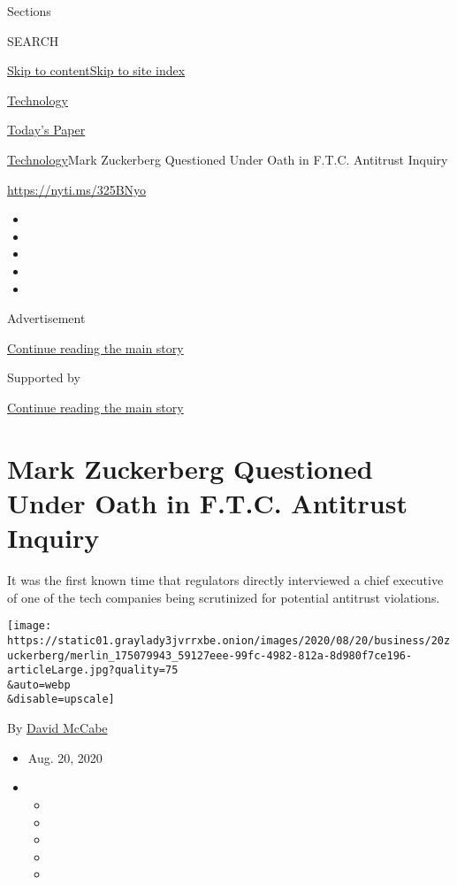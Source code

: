 Sections

SEARCH

\protect\hyperlink{site-content}{Skip to
content}\protect\hyperlink{site-index}{Skip to site index}

\href{https://www.nytimes3xbfgragh.onion/section/technology}{Technology}

\href{https://myaccount.nytimes3xbfgragh.onion/auth/login?response_type=cookie\&client_id=vi}{}

\href{https://www.nytimes3xbfgragh.onion/section/todayspaper}{Today's
Paper}

\href{/section/technology}{Technology}\textbar{}Mark Zuckerberg
Questioned Under Oath in F.T.C. Antitrust Inquiry

\url{https://nyti.ms/325BNyo}

\begin{itemize}
\item
\item
\item
\item
\item
\end{itemize}

Advertisement

\protect\hyperlink{after-top}{Continue reading the main story}

Supported by

\protect\hyperlink{after-sponsor}{Continue reading the main story}

\hypertarget{mark-zuckerberg-questioned-under-oath-in-ftc-antitrust-inquiry}{%
\section{Mark Zuckerberg Questioned Under Oath in F.T.C. Antitrust
Inquiry}\label{mark-zuckerberg-questioned-under-oath-in-ftc-antitrust-inquiry}}

It was the first known time that regulators directly interviewed a chief
executive of one of the tech companies being scrutinized for potential
antitrust violations.

\texttt{[image: https://static01.graylady3jvrrxbe.onion/images/2020/08/20/business/20zuckerberg/merlin\_175079943\_59127eee-99fc-4982-812a-8d980f7ce196-articleLarge.jpg?quality=75\\\&auto=webp\\\&disable=upscale]}

By \href{https://www.nytimes3xbfgragh.onion/by/david-mccabe}{David
McCabe}

\begin{itemize}
\item
  Aug. 20, 2020
\item
  \begin{itemize}
  \item
  \item
  \item
  \item
  \item
  \end{itemize}
\end{itemize}

